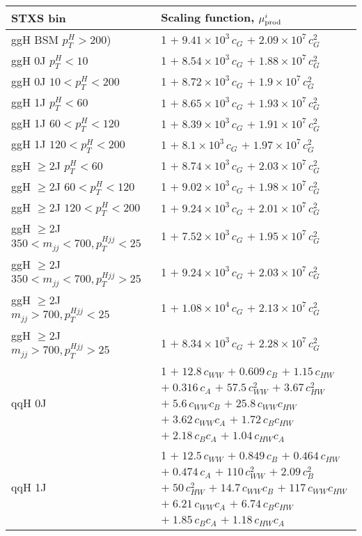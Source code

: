 \begin{tabular}{l|p{}}
    STXS bin & Scaling function, $\mu^i_{\rm{prod}}$ \\ \hline
    ggH BSM $p_{T}^{H} > 200$) & 1 $+\;9.41\times 10^{3}\,c_{G}$ $+\;2.09\times 10^{7}\,c_{G}^{2}$ \\
    ggH 0J $p_{T}^{H} < 10$ & 1 $+\;8.54\times 10^{3}\,c_{G}$ $+\;1.88\times 10^{7}\,c_{G}^{2}$ \\
    ggH 0J $10 < p_{T}^{H} < 200$ & 1 $+\;8.72\times 10^{3}\,c_{G}$ $+\;1.9\times 10^{7}\,c_{G}^{2}$ \\
    ggH 1J $p_{T}^{H} < 60$ & 1 $+\;8.65\times 10^{3}\,c_{G}$ $+\;1.93\times 10^{7}\,c_{G}^{2}$ \\
    ggH 1J $60 < p_{T}^{H} < 120$ & 1 $+\;8.39\times 10^{3}\,c_{G}$ $+\;1.91\times 10^{7}\,c_{G}^{2}$ \\
    ggH 1J $120 < p_{T}^{H} < 200$ & 1 $+\;8.1\times 10^{3}\,c_{G}$ $+\;1.97\times 10^{7}\,c_{G}^{2}$ \\
    ggH $\geq$2J $p_{T}^{H} < 60$ & 1 $+\;8.74\times 10^{3}\,c_{G}$ $+\;2.03\times 10^{7}\,c_{G}^{2}$ \\
    ggH $\geq$2J $60 < p_{T}^{H} < 120$ & 1 $+\;9.02\times 10^{3}\,c_{G}$ $+\;1.98\times 10^{7}\,c_{G}^{2}$ \\
    ggH $\geq$2J $120 < p_{T}^{H} < 200$ & 1 $+\;9.24\times 10^{3}\,c_{G}$ $+\;2.01\times 10^{7}\,c_{G}^{2}$ \\
    ggH $\geq$2J $350 < m_{jj} < 700, p_{T}^{Hjj} < 25$ & 1 $+\;7.52\times 10^{3}\,c_{G}$ $+\;1.95\times 10^{7}\,c_{G}^{2}$ \\
    ggH $\geq$2J $350 < m_{jj} < 700, p_{T}^{Hjj} > 25$ & 1 $+\;9.24\times 10^{3}\,c_{G}$ $+\;2.03\times 10^{7}\,c_{G}^{2}$ \\
    ggH $\geq$2J $m_{jj} > 700, p_{T}^{Hjj} < 25$ & 1 $+\;1.08\times 10^{4}\,c_{G}$ $+\;2.13\times 10^{7}\,c_{G}^{2}$ \\
    ggH $\geq$2J $m_{jj} > 700, p_{T}^{Hjj} > 25$ & 1 $+\;8.34\times 10^{3}\,c_{G}$ $+\;2.28\times 10^{7}\,c_{G}^{2}$ \\
    \hline
    qqH 0J & 1 $+\;12.8\,c_{WW}$ $+\;0.609\,c_{B}$ $+\;1.15\,c_{HW}$ $+\;0.316\,c_{A}$ $+\;57.5\,c_{WW}^{2}$ $+\;3.67\,c_{HW}^{2}$ $+\;5.6\,c_{WW}c_{B}$ $+\;25.8\,c_{WW}c_{HW}$ $+\;3.62\,c_{WW}c_{A}$ $+\;1.72\,c_{B}c_{HW}$ $+\;2.18\,c_{B}c_{A}$ $+\;1.04\,c_{HW}c_{A}$ \\
    qqH 1J & 1 $+\;12.5\,c_{WW}$ $+\;0.849\,c_{B}$ $+\;0.464\,c_{HW}$ $+\;0.474\,c_{A}$ $+\;110\,c_{WW}^{2}$ $+\;2.09\,c_{B}^{2}$ $+\;50\,c_{HW}^{2}$ $+\;14.7\,c_{WW}c_{B}$ $+\;117\,c_{WW}c_{HW}$ $+\;6.21\,c_{WW}c_{A}$ $+\;6.74\,c_{B}c_{HW}$ $+\;1.85\,c_{B}c_{A}$ $+\;1.18\,c_{HW}c_{A}$ \\

\end{tabular}
